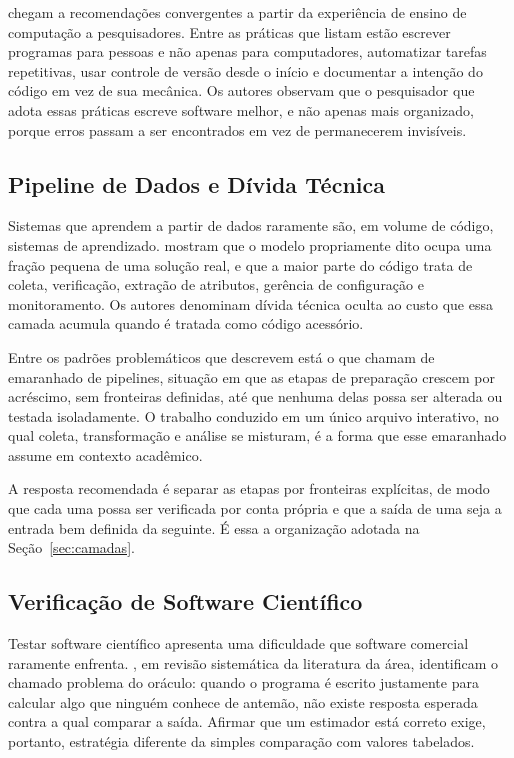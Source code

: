  chegam a recomendações convergentes a partir da
experiência de ensino de computação a pesquisadores. Entre as práticas que
listam estão escrever programas para pessoas e não apenas para computadores,
automatizar tarefas repetitivas, usar controle de versão desde o início e
documentar a intenção do código em vez de sua mecânica. Os autores observam que
o pesquisador que adota essas práticas escreve software melhor, e não apenas mais
organizado, porque erros passam a ser encontrados em vez de permanecerem
invisíveis.

\subsection{Pipeline de Dados e Dívida Técnica}\label{sec:divida-tecnica}

Sistemas que aprendem a partir de dados raramente são, em volume de código,
sistemas de aprendizado.  mostram que o modelo
propriamente dito ocupa uma fração pequena de uma solução real, e que a maior
parte do código trata de coleta, verificação, extração de atributos, gerência de
configuração e monitoramento. Os autores denominam dívida técnica oculta ao
custo que essa camada acumula quando é tratada como código acessório.

Entre os padrões problemáticos que descrevem está o que chamam de emaranhado de
pipelines, situação em que as etapas de preparação crescem por acréscimo, sem
fronteiras definidas, até que nenhuma delas possa ser alterada ou testada
isoladamente. O trabalho conduzido em um único arquivo interativo, no qual
coleta, transformação e análise se misturam, é a forma que esse emaranhado
assume em contexto acadêmico.

A resposta recomendada é separar as etapas por fronteiras explícitas, de modo que
cada uma possa ser verificada por conta própria e que a saída de uma seja a
entrada bem definida da seguinte. É essa a organização adotada na
Seção~\ref{sec:camadas}.

\subsection{Verificação de Software Científico}\label{sec:teste-cientifico}

Testar software científico apresenta uma dificuldade que software comercial
raramente enfrenta. , em revisão sistemática da
literatura da área, identificam o chamado problema do oráculo: quando o programa
é escrito justamente para calcular algo que ninguém conhece de antemão, não
existe resposta esperada contra a qual comparar a saída. Afirmar que um
estimador está correto exige, portanto, estratégia diferente da simples
comparação com valores tabelados.

